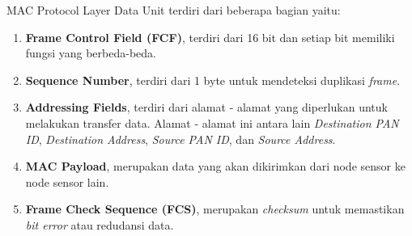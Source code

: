 MAC Protocol Layer Data Unit terdiri dari beberapa bagian yaitu:
\begin{enumerate}
    \item \textbf{Frame Control Field (FCF)}, terdiri dari 16 bit dan setiap bit memiliki fungsi yang berbeda-beda.
    \item \textbf{Sequence Number}, terdiri dari 1 byte untuk mendeteksi duplikasi \textit{frame}.
    \item \textbf{Addressing Fields}, terdiri dari alamat - alamat yang diperlukan untuk melakukan transfer data. Alamat - alamat ini antara lain \textit{Destination PAN ID}, \textit{Destination Address}, \textit{Source PAN ID}, dan \textit{Source Address}.
    \item \textbf{MAC Payload}, merupakan data yang akan dikirimkan dari node sensor ke node sensor lain.
    \item \textbf{Frame Check Sequence (FCS)}, merupakan \textit{checksum} untuk memastikan \textit{bit error} atau redudansi data.
\end{enumerate}